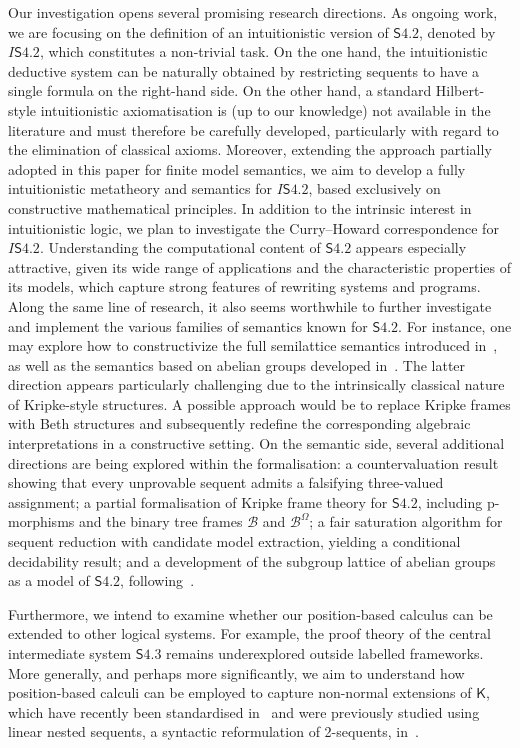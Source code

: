 \documentclass{article}
\newcommand{\logic}{\mathsf{S4.2}}
\newcommand{\axname}[1]{\mathsf{#1}}
\theoremstyle{definition}
\begin{document}
Our investigation opens several promising research directions. As ongoing work, we are focusing on the definition of an intuitionistic version of $\logic$, denoted by $I\logic$, which constitutes a non-trivial task. On the one hand, the intuitionistic deductive system can be naturally obtained by restricting sequents to have a single formula on the right-hand side. On the other hand, a standard Hilbert-style intuitionistic axiomatisation is (up to our knowledge) not available in the literature and must therefore be carefully developed, particularly with regard to the elimination of classical axioms.
Moreover, extending the approach partially adopted in this paper for finite model semantics, we aim to develop a fully intuitionistic metatheory and semantics for $I\logic$, based exclusively on constructive mathematical principles.
In addition to the intrinsic interest in intuitionistic logic, we plan to investigate the Curry–Howard correspondence for $I\logic$. Understanding the computational content of $\logic$ appears especially attractive, given its wide range of applications and the characteristic properties of its models, which capture strong features of rewriting systems and programs.
Along the same line of research, it also seems worthwhile to further investigate and implement the various families of semantics known for $\logic$. For instance, one may explore how to constructivize the full semilattice semantics introduced in~\cite{Martini2024:S42NaturalDeduction}, as well as the semantics based on abelian groups developed in~\cite{Berger2023:ModalAbelian}. The latter direction appears particularly challenging due to the intrinsically classical nature of Kripke-style structures. A possible approach would be to replace Kripke frames with Beth structures and subsequently redefine the corresponding algebraic interpretations in a constructive setting.
On the semantic side, several additional directions are being explored within the formalisation: a countervaluation result showing that every unprovable sequent admits a falsifying three-valued assignment; a partial formalisation of Kripke frame theory for $\logic$, including p-morphisms and the binary tree frames $\mathcal{B}$ and $\mathcal{B}^\Omega$; a fair saturation algorithm for sequent reduction with candidate model extraction, yielding a conditional decidability result; and a development of the subgroup lattice of abelian groups as a model of $\logic$, following~\cite{Berger2023:ModalAbelian}.

Furthermore, we intend to examine whether our position-based calculus can be extended to other logical systems. For example, the proof theory of the central intermediate system $\axname{S4.3}$ remains underexplored outside labelled frameworks. More generally, and perhaps more significantly, we aim to understand how position-based calculi can be employed to capture non-normal extensions of $\axname{K}$, which have recently been standardised in~\cite{Dalmonte2025:MinimalModal} and were previously studied using linear nested sequents, a syntactic reformulation of 2-sequents, in~\cite{Pimentel2019}.
\end{document}
